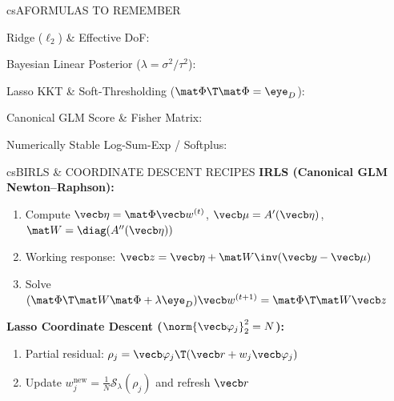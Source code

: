 \documentclass[../../../../master.tex]{subfiles}
\begin{document}
\begin{cscolumns}
\begin{cscard}{csA}{FORMULAS TO REMEMBER}
  \begin{csbul}
    \item Ridge ($\ell_2$) \& Effective DoF:
    \item Bayesian Linear Posterior ($\lambda=\sigma^2/\tau^2$):
    \item Lasso KKT \& Soft-Thresholding ($\mat\Phi\T\mat\Phi=\eye_D$):
    \item Canonical GLM Score \& Fisher Matrix:
    \item Numerically Stable Log-Sum-Exp / Softplus:
  \end{csbul}
\end{cscard}

\begin{cscard}{csB}{IRLS \& COORDINATE DESCENT RECIPES}
  \textbf{IRLS (Canonical GLM Newton--Raphson):}
  \begin{enumerate}[leftmargin=1.2em, itemsep=1pt, topsep=1pt, parsep=0pt]
    \item Compute $\vecb\eta=\mat\Phi\vecb w^{(t)}$, $\vecb\mu=A'(\vecb\eta)$, $\mat W=\diag(A''(\vecb\eta))$
    \item Working response: $\vecb z=\vecb\eta+\mat W\inv(\vecb y-\vecb\mu)$
    \item Solve $(\mat\Phi\T\mat W\mat\Phi+\lambda\eye_D)\vecb w^{(t+1)}=\mat\Phi\T\mat W\vecb z$
  \end{enumerate}
  \vspace{2pt}
  \textbf{Lasso Coordinate Descent ($\norm{\vecb\varphi_j}_2^2=N$):}
  \begin{enumerate}[leftmargin=1.2em, itemsep=1pt, topsep=1pt, parsep=0pt]
    \item Partial residual: $\rho_j=\vecb\varphi_j\T(\vecb r+w_j\vecb\varphi_j)$
    \item Update $w_j^{\mathrm{new}}=\frac{1}{N}\mathcal S_\lambda(\rho_j)$ and refresh $\vecb r$
  \end{enumerate}
\end{cscard}
\columnbreak


\end{cscolumns}
\end{document}
